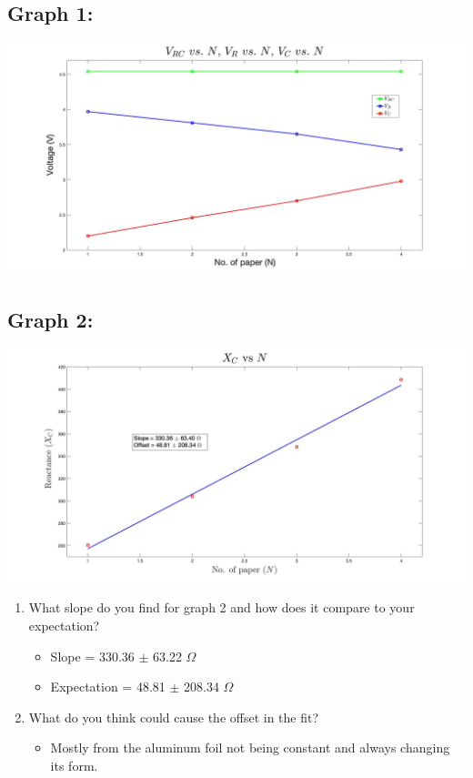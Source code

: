 \documentclass{article}
\begin{document}
\begin{center}
  \subsection*{Graph 1:}
  \includegraphics[scale=0.2]{graph1.jpg}
  \subsection*{Graph 2:}
  \includegraphics[scale=0.2]{graph2.jpg}
\end{center}
\newpage
\begin{center}
  \begin{enumerate}
    \item What slope do you find for graph 2 and how does it compare to your expectation?
    \begin{itemize}
      \item Slope = 330.36 \(\pm \) 63.22 \(\Omega \)
      \item Expectation = 48.81 \(\pm \) 208.34 \(\Omega \)
    \end{itemize}
    \item What do you think could cause the offset in the fit?
    \begin{itemize}
      \item Mostly from the aluminum foil not being constant and always changing its form.
    \end{itemize}
  \end{enumerate}
\end{center}
\end{document}
